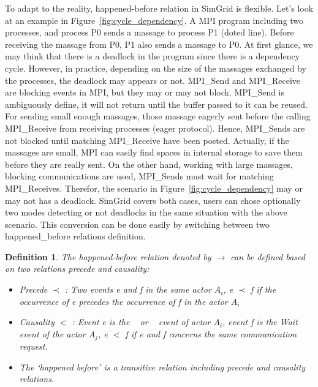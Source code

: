 \documentclass[a4paper,11pt]{article}
\newtheorem{definition}{Definition}
\begin{document}
 To adapt to the reality, happened-before relation in SimGrid is flexible. Let's look at an example in Figure~\ref{fig:cycle_dependency}. A MPI program including two processes, and process P0 sends a massage to process P1 (doted line). Before receiving  the massage from P0, P1 also sends a massage to P0. At first glance, we may think that there is a deadlock in the program since there is a dependency cycle. However, in practice, depending on the size of the massages exchanged by the processes, the deadlock may appears or not. MPI\_Send and MPI\_Receive are blocking events in MPI, but they may or may not block. MPI\_Send is ambiguously define, it will not return until the buffer passed to it can be reused. For sending small enough massages, those massage eagerly sent before the calling MPI\_Receive from receiving processes (eager protocol). Hence, MPI\_Sends are not blocked until matching MPI\_Receive have been posted. Actually, if the massages are small, MPI can easily find spaces in internal storage to save them before they are really sent. On the other hand, working with large massages, blocking communications are used, MPI\_Sends must wait for matching MPI\_Receives. Therefor, the scenario in Figure~\ref{fig:cycle_dependency} may or may not has a deadlock. SimGrid covers both cases, users can chose optionally two modes detecting or not deadlocks in the same situation with the above scenario. This conversion can be done easily by switching between two happened\_before relations definition.    
  \begin{definition}
  	\label{def:happedBefore1}
  The happened-before relation  denoted by  $\rightarrow $ can be defined based on two relations precede and causality: \begin{itemize}
  	\item Precede $ \prec$ :  Two events e and f in the same actor $A_i$, e $ \prec$ f if the occurrence of e precedes the occurrence of f in the actor $A_i$  
  	\item Causality $<$ : Event e is the \asynsend~ or \asynreceive~ event of actor $A_i$, event f is the Wait event of the actor $A_j$,  e $<$ f if e and f concerns the same communication request.
  	\item The ‘happened before’ is a transitive relation including precede and causality relations. 
  \end{itemize}\end{definition} 
  
\end{document}

